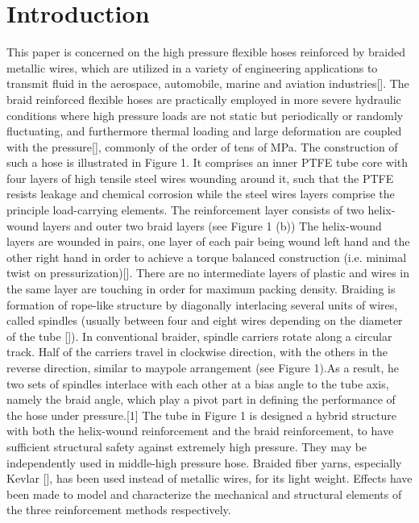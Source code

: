 \section{Introduction}
\label{introduction}




This paper is concerned on the high pressure flexible hoses reinforced by braided metallic wires, which are utilized in a variety of engineering applications to transmit fluid in the aerospace, automobile, marine and aviation industries[]. The braid reinforced flexible hoses are practically employed in more severe hydraulic conditions where high pressure loads are not static but periodically or randomly fluctuating, and furthermore thermal loading and large deformation are coupled with the pressure[], commonly of the order of tens of MPa. 
The construction of such a hose is illustrated in Figure 1. It comprises an inner PTFE tube core with four layers of high tensile steel wires wounding around it, such that the PTFE resists leakage and chemical corrosion while the steel wires layers comprise the principle load-carrying elements. The reinforcement layer consists of two helix-wound layers and outer two braid layers (see Figure 1 (b))
The helix-wound layers are wounded in pairs, one layer of each pair being wound left hand and the other right hand in order to achieve a torque balanced construction (i.e. minimal twist on pressurization)[]. There are no intermediate layers of plastic and wires in the same layer are touching in order for maximum packing density.
Braiding is formation of rope-like structure by diagonally interlacing several units of wires, called spindles (usually between four and eight wires depending on the diameter of the tube []). 
In conventional braider, spindle carriers rotate along a circular track. Half of the carriers travel in clockwise direction, with the others in the reverse direction, similar to maypole arrangement (see Figure 1).As a result, he two sets of spindles interlace with each other at a bias angle to the tube axis, namely the braid angle, which play a pivot part in defining the performance of the hose under pressure.[1]
The tube in Figure 1 is designed a hybrid structure with both the helix-wound reinforcement and the braid reinforcement, to have sufficient structural safety against extremely high pressure. They may be independently used in middle-high pressure hose. Braided fiber yarns, especially Kevlar [], has been used instead of metallic wires, for its light weight. Effects have been made to model and characterize the mechanical and structural elements of the three reinforcement methods respectively.




